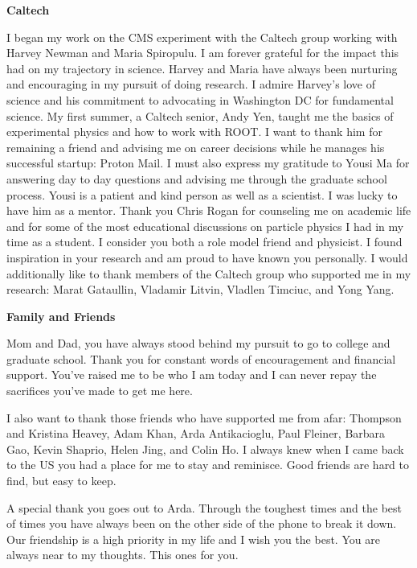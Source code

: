 \begin{center} \textbf{Caltech} \end{center}

I began my work on the CMS experiment with the Caltech group working with Harvey Newman and Maria Spiropulu. I am forever grateful  for the impact this had on my 
trajectory in science. Harvey and Maria have always been nurturing
and encouraging in my pursuit of doing research. 
I admire Harvey's love of science and his commitment to advocating
in Washington DC for fundamental science. My first summer, a Caltech senior, Andy Yen, taught me the basics of experimental physics 
and how to work with ROOT. I want to thank him for remaining a friend and advising
 me on career decisions while he manages his successful startup: Proton Mail. I must
also express my gratitude to Yousi Ma for answering day to day questions and advising
me through the graduate school process. 
Yousi is a patient and kind person as well as a scientist. I was lucky to have him
as a mentor. Thank you Chris Rogan for counseling me on academic life and for some
of the most educational discussions on particle physics I had in my time as a student. I consider you both a role model friend and physicist. 
I found inspiration in your research and am proud to have known you personally. I would additionally like to
thank members of the Caltech group who supported me in my research: Marat Gataullin, 
Vladamir Litvin, Vladlen Timciuc, and Yong Yang.

\begin{center} \textbf{Family and Friends} \end{center}

Mom and Dad, you have always stood behind my pursuit to go to college and graduate school. Thank you for constant words of encouragement and financial support. 
You've raised me to be who I am today and I can never repay the sacrifices
you've made to get me here.

I also want to thank those friends who have supported me from afar: Thompson and Kristina Heavey, Adam Khan, Arda Antikacioglu, Paul Fleiner, Barbara Gao,
 Kevin Shaprio, Helen Jing, and Colin Ho. I always knew when I came back to the US you had
a place for me to stay and reminisce. Good friends are hard to find, but easy to keep.

A special thank you goes out to  Arda. Through the toughest times and the best of times you have always been on the other 
side of the phone to break it down. Our friendship is a high priority in my life and I wish you the best. You are always near to my thoughts. This ones for you. 

